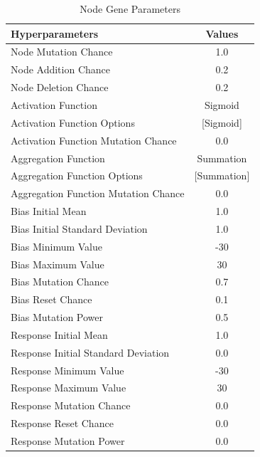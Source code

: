 \documentclass[letterpaper, 12pt]{article}
\begin{document}
\begin{table}[H]
\centering
\caption{Node Gene Parameters}
\begin{NiceTabular}{X|c}
\toprule
\textbf{Hyperparameters} & \textbf{Values} \\
\midrule
Node Mutation Chance & 1.0 \\
Node Addition Chance & 0.2 \\
Node Deletion Chance & 0.2 \\

Activation Function & Sigmoid \\
Activation Function Options & [Sigmoid] \\
Activation Function Mutation Chance & 0.0 \\

Aggregation Function & Summation \\
Aggregation Function Options & [Summation] \\
Aggregation Function Mutation Chance & 0.0 \\

Bias Initial Mean & 1.0 \\
Bias Initial Standard Deviation & 1.0 \\
Bias Minimum Value & -30 \\
Bias Maximum Value & 30 \\
Bias Mutation Chance & 0.7 \\
Bias Reset Chance & 0.1 \\
Bias Mutation Power & 0.5 \\

Response Initial Mean & 1.0 \\
Response Initial Standard Deviation & 0.0 \\
Response Minimum Value & -30 \\
Response Maximum Value & 30 \\
Response Mutation Chance & 0.0 \\
Response Reset Chance & 0.0 \\
Response Mutation Power & 0.0 \\
\bottomrule
\end{NiceTabular}
\end{table}
\end{document}
